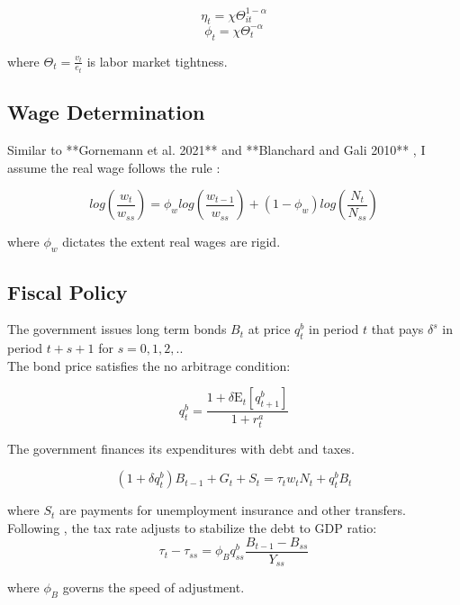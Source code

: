 \documentclass[\econtexRoot/HAFiscal]{subfiles}
\begin{document}
$$\eta_{t} = \chi \Theta_{it}^{1-\alpha} $$
$$ \phi_{t} = \chi \Theta_{t}^{-\alpha} $$ 
\vspace{.1cm}

where $\Theta_{t} = \frac{v_{t}}{e_{t}}$ is labor market tightness.



\subsection{Wage Determination }


Similar to **Gornemann et al. 2021** and **Blanchard and Gali 2010** , I assume the real wage follows the rule :

$$log\left(\frac{w_{t}}{w_{ss}}\right)  = \phi_w log\left( \frac{ w_{t-1}}{ w_{ss}} \right) +   (1 - \phi_w) log\left( \frac{N_{t}}{N_{ss}}\right)$$
\vspace{.2cm}

where $\phi_w$ dictates the extent real wages are rigid. 



\subsection{Fiscal Policy}

The government issues long term bonds $B_{t}$ at price $q^{b}_{t}$ in period $t$ that pays $\delta^{s}$ in period $t+s+1$ for $s = 0,1,2, ..$ \\

The bond price satisfies the no arbitrage condition:

$$q^{b}_{t} = \frac{ 1  + \delta \mathrm{E}_{t}[q^{b}_{t+1}]}{1+r^{a}_{t}}$$ 


The government finances its expenditures with debt and taxes. 

$$ (1 + \delta q^{b}_{t})B_{t-1} + G_{t}  + S_{t} = \tau_{t} w_{t} N_{t}+ q^{b}_{t}B_{t}$$
\vspace{.4cm}

where $ S_{t}$ are payments for unemployment insurance and other transfers. \\

Following \cite{AuclertMicroJumpsMacroHumps}, the tax rate adjusts to stabilize the debt to GDP ratio:\\
$$ \tau_{t} - \tau_{ss} = \phi_{B} q^{b}_{ss} \frac{B_{t-1} - B_{ss} }{Y_{ss}}$$

\vspace{.4cm}
where $\phi_{B}$ governs the speed of adjustment. 
\end{document}
